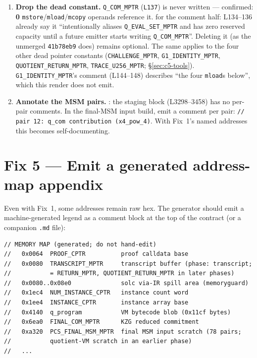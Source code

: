 \begin{enumerate}
\item \textbf{Drop the dead constant.} \texttt{Q\_COM\_MPTR}
(\texttt{L137}) is never written --- confirmed: \textbf{0}
\texttt{mstore}/\texttt{mload}/\texttt{mcopy} operands reference it.
 for the comment half: L134--136 already say it
``intentionally aliases \texttt{Q\_\allowbreak{}EVAL\_\allowbreak{}SET\_\allowbreak{}MPTR} and has zero reserved
capacity until a future emitter starts writing \texttt{Q\_COM\_MPTR}''.
Deleting it (as the unmerged \texttt{41b78eb9} does) remains optional. The
same applies to the four other dead pointer constants
(\texttt{CHALLENGE\_MPTR}, \texttt{G1\_\allowbreak{}IDENTITY\_\allowbreak{}MPTR},
\texttt{QUOTIENT\_\allowbreak{}RETURN\_\allowbreak{}MPTR}, \texttt{TRACE\_U256\_MPTR};
\S\ref{sec:c5-tools}). \texttt{G1\_\allowbreak{}IDENTITY\_\allowbreak{}MPTR}'s comment (L144--148)
describes ``the four \texttt{mload}s below'', which this render does not
emit.
\item \textbf{Annotate the MSM pairs.} : the staging block
(L3298--3458) has no per-pair comments. In the final-MSM input build,
emit a comment per pair: \texttt{/\allowbreak{}/\allowbreak{} pair 12: q\_\allowbreak{}com contribution
(x4\_\allowbreak{}pow\_\allowbreak{}4)}. With Fix~1's named addresses this becomes self-documenting.
\end{enumerate}

\section{Fix 5 --- Emit a generated address-map appendix}
\label{sec:read-addressmap}

Even with Fix~1, some addresses remain raw hex. The generator should emit
a machine-generated legend as a comment block at the top of the contract
(or a companion \texttt{.md} file):

\begin{lstlisting}[style=plain]
// MEMORY MAP (generated; do not hand-edit)
//   0x0064  PROOF_CPTR          proof calldata base
//   0x0080  TRANSCRIPT_MPTR     transcript buffer (phase: transcript;
//           = RETURN_MPTR, QUOTIENT_RETURN_MPTR in later phases)
//   0x0080..0x08e0              solc via-IR spill area (memoryguard)
//   0x1ec4  NUM_INSTANCE_CPTR   instance count word
//   0x1ee4  INSTANCE_CPTR       instance array base
//   0x4140  q_program           VM bytecode blob (0x11cf bytes)
//   0x6ea0  FINAL_COM_MPTR      KZG reduced commitment
//   0xa320  PCS_FINAL_MSM_MPTR  final MSM input scratch (78 pairs;
//           quotient-VM scratch in an earlier phase)
//   ...
\end{lstlisting}

